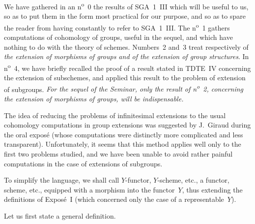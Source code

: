 We have gathered in an n\textsuperscript{o}~0 the results of SGA~1~III
which will be useful to us, so as to put them in the form most practical
for our purpose, and so as to spare the reader from having constantly to
refer to SGA~1~III.%
{\renewcommand{\thefootnote}{(1)}}
The n\textsuperscript{o}~1 gathers computations of cohomology of groups,
useful in the sequel, and which have nothing to do with the theory of
schemes. Numbers~2 and~3 treat respectively of \emph{the extension of
morphisms of groups and of the extension of group structures}. In
n\textsuperscript{o}~4, we have briefly recalled the proof of a result
stated in TDTE~IV concerning the extension of subschemes, and applied
this result to the problem of extension of subgroups. \emph{For the
sequel of the Seminar, only the result of n\textsuperscript{o}~2,
concerning the extension of morphisms of groups, will be
indispensable.}%
{\renewcommand{\thefootnote}{(2)}}

The idea of reducing the problems of infinitesimal extensions to the
usual cohomology computations in group extensions was suggested by
J.~Giraud during the oral expos\'e (whose computations were distinctly
more complicated and less transparent). Unfortunately, it seems that
this method applies well only to the first two problems studied, and we
have been unable to avoid rather painful computations in the case of
extensions of subgroups.

To simplify the language, we shall call \(Y\)-functor, \resp
\(Y\)-scheme, etc., a functor, \resp scheme, etc., equipped with a
morphism into the functor~\(Y\), thus extending the definitions of
Expos\'e~I (which concerned only the case of a representable~\(Y\)).

\label{III.sec.0}

Let us first state a general definition.

